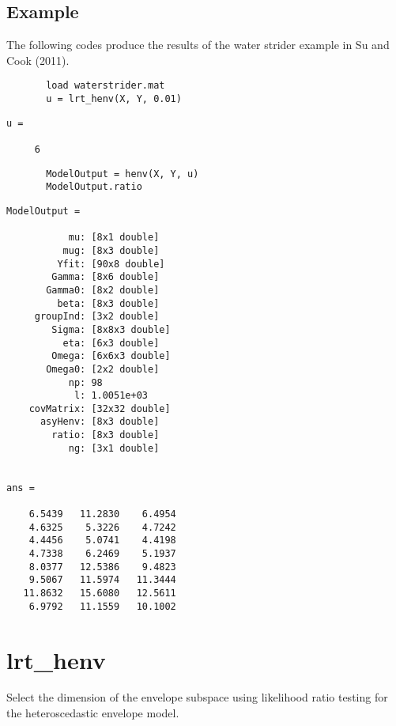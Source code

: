 \documentclass[a4paper,11pt,openany]{memoir}
\begin{document}
\subsection*{Example}

\begin{par}
The following codes produce the results of the water strider example in Su and Cook (2011).
\end{par} \vspace{1em}

\begin{verbatim}       load waterstrider.mat
       u = lrt_henv(X, Y, 0.01)
       \end{verbatim}
               \color{lightgray}\ttfamily \begin{verbatim}
u =

     6
\end{verbatim} \rmfamily
\color{black}
\begin{verbatim}       ModelOutput = henv(X, Y, u)
       ModelOutput.ratio\end{verbatim}

 \color{lightgray}\ttfamily \begin{verbatim}
ModelOutput = 

           mu: [8x1 double]
          mug: [8x3 double]
         Yfit: [90x8 double]
        Gamma: [8x6 double]
       Gamma0: [8x2 double]
         beta: [8x3 double]
     groupInd: [3x2 double]
        Sigma: [8x8x3 double]
          eta: [6x3 double]
        Omega: [6x6x3 double]
       Omega0: [2x2 double]
           np: 98
            l: 1.0051e+03
    covMatrix: [32x32 double]
      asyHenv: [8x3 double]
        ratio: [8x3 double]
           ng: [3x1 double]


ans =

    6.5439   11.2830    6.4954
    4.6325    5.3226    4.7242
    4.4456    5.0741    4.4198
    4.7338    6.2469    5.1937
    8.0377   12.5386    9.4823
    9.5067   11.5974   11.3444
   11.8632   15.6080   12.5611
    6.9792   11.1559   10.1002

\end{verbatim} \rmfamily
\color{black}
    
\newpage
    
\rmfamily
\color{black}\section{lrt\_henv}

\begin{par}
Select the dimension of the envelope subspace using likelihood ratio testing for the heteroscedastic envelope model.
\end{par} \vspace{1em}
\end{document}

